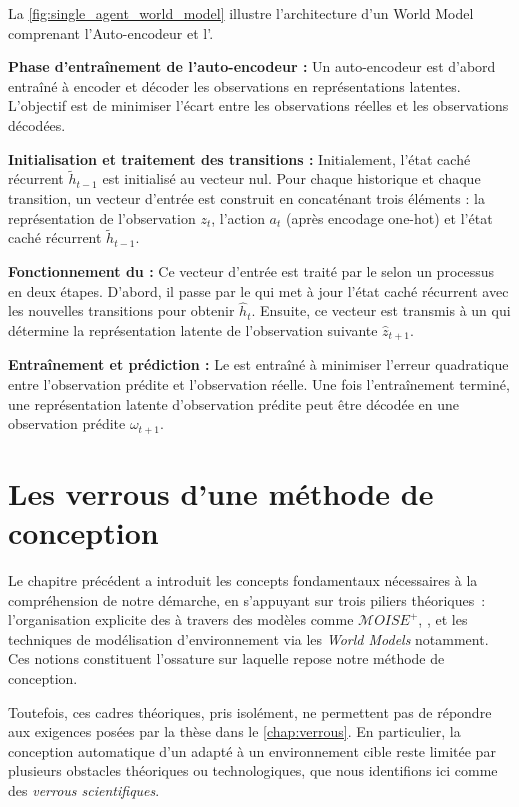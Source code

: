 La \autoref{fig:single_agent_world_model} illustre l'architecture d'un World Model comprenant l'Auto-encodeur et l'.

\textbf{Phase d'entraînement de l'auto-encodeur :} Un auto-encodeur est d'abord entraîné à encoder et décoder les observations en représentations latentes. L'objectif est de minimiser l'écart entre les observations réelles et les observations décodées.

\textbf{Initialisation et traitement des transitions :} Initialement, l'état caché récurrent $\tilde{h}_{t-1}$ est initialisé au vecteur nul. Pour chaque historique et chaque transition, un vecteur d'entrée est construit en concaténant trois éléments : la représentation de l'observation $z_t$, l'action $a_t$ (après encodage one-hot) et l'état caché récurrent $\tilde{h}_{t-1}$.

\textbf{Fonctionnement du  :} Ce vecteur d'entrée est traité par le  selon un processus en deux étapes. D'abord, il passe par le  qui met à jour l'état caché récurrent avec les nouvelles transitions pour obtenir $\hat{h}_t$. Ensuite, ce vecteur est transmis à un  qui détermine la représentation latente de l'observation suivante $\hat{z}_{t+1}$.

\textbf{Entraînement et prédiction :} Le  est entraîné à minimiser l'erreur quadratique entre l'observation prédite et l'observation réelle. Une fois l'entraînement terminé, une représentation latente d'observation prédite peut être décodée en une observation prédite $\omega_{t+1}$.

\chapter{Les verrous d'une méthode de conception}
\label{chap:verrous}

\noindent
Le chapitre précédent a introduit les concepts fondamentaux nécessaires à la compréhension de notre démarche, en s'appuyant sur trois piliers théoriques~: l'organisation explicite des  à travers des modèles comme \textit{$\mathcal{M}OISE^+$}, , et les techniques de modélisation d'environnement via les \textit{World Models} notamment. Ces notions constituent l'ossature sur laquelle repose notre méthode de conception.

Toutefois, ces cadres théoriques, pris isolément, ne permettent pas de répondre aux exigences posées par la thèse dans le \autoref{chap:verrous}. En particulier, la conception automatique d'un  adapté à un environnement cible reste limitée par plusieurs obstacles théoriques ou technologiques, que nous identifions ici comme des \textit{verrous scientifiques}.

